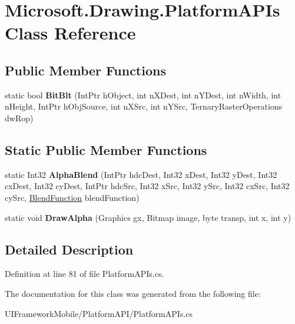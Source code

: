 \hypertarget{class_microsoft_1_1_drawing_1_1_platform_a_p_is}{
\section{Microsoft.Drawing.PlatformAPIs Class Reference}
\label{class_microsoft_1_1_drawing_1_1_platform_a_p_is}
}
\subsection*{Public Member Functions}
\begin{DoxyCompactItemize}
\item 
\hypertarget{class_microsoft_1_1_drawing_1_1_platform_a_p_is_ab0152792ace3bc85ed59ed1d6a7cf965}{
static bool {\bfseries BitBlt} (IntPtr hObject, int nXDest, int nYDest, int nWidth, int nHeight, IntPtr hObjSource, int nXSrc, int nYSrc, TernaryRasterOperations dwRop)}
\label{class_microsoft_1_1_drawing_1_1_platform_a_p_is_ab0152792ace3bc85ed59ed1d6a7cf965}

\end{DoxyCompactItemize}
\subsection*{Static Public Member Functions}
\begin{DoxyCompactItemize}
\item 
\hypertarget{class_microsoft_1_1_drawing_1_1_platform_a_p_is_a2bce406fd2eb409368dc70325341c5f4}{
static Int32 {\bfseries AlphaBlend} (IntPtr hdcDest, Int32 xDest, Int32 yDest, Int32 cxDest, Int32 cyDest, IntPtr hdcSrc, Int32 xSrc, Int32 ySrc, Int32 cxSrc, Int32 cySrc, \hyperlink{struct_microsoft_1_1_drawing_1_1_blend_function}{BlendFunction} blendFunction)}
\label{class_microsoft_1_1_drawing_1_1_platform_a_p_is_a2bce406fd2eb409368dc70325341c5f4}

\item 
\hypertarget{class_microsoft_1_1_drawing_1_1_platform_a_p_is_a001e476d0ba61c6896e3adb443fa8498}{
static void {\bfseries DrawAlpha} (Graphics gx, Bitmap image, byte transp, int x, int y)}
\label{class_microsoft_1_1_drawing_1_1_platform_a_p_is_a001e476d0ba61c6896e3adb443fa8498}

\end{DoxyCompactItemize}


\subsection{Detailed Description}


Definition at line 81 of file PlatformAPIs.cs.

The documentation for this class was generated from the following file:\begin{DoxyCompactItemize}
\item 
UIFrameworkMobile/PlatformAPI/PlatformAPIs.cs\end{DoxyCompactItemize}
